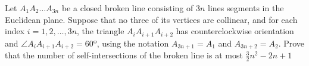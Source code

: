 Let $A_{1}A_{2} \dots A_{3n}$ be a closed broken line consisting of $3n$ lines segments in the Euclidean plane. Suppose that no three of its vertices are collinear, and for each index $i=1,2,\dots,3n$, the triangle $A_{i}A_{i+1}A_{i+2}$ has counterclockwise orientation and $\angle A_{i}A_{i+1}A_{i+2} = 60º$, using the notation $A_{3n+1} = A_{1}$ and $A_{3n+2} = A_{2}$. Prove that the number of self-intersections of the broken line is at most $\frac{3}{2}n^{2} - 2n + 1$